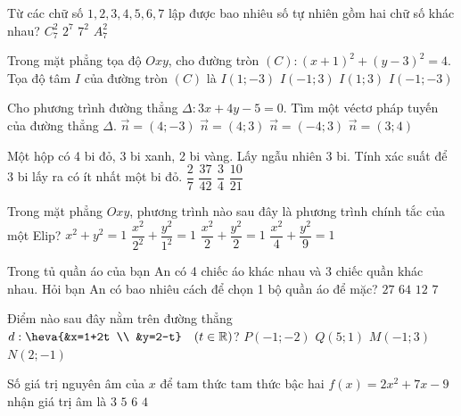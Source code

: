 \begin{ex}%
	Từ các chữ số $1,2,3,4,5,6,7$ lập được bao nhiêu số tự nhiên gồm hai chữ số khác nhau?
	\choice
	{$C_7^2$}
	{$2^7$}
	{$7^2$}
	{\True $A_7^2$}
	\loigiai{}
\end{ex}
\begin{ex}%
	Trong mặt phẳng tọa độ $Ox y$, cho đường tròn $(C)\colon (x+1)^2+(y-3)^2=4$. Tọa độ tâm $I$ của đường tròn $(C)$ là
	\choice
	{$I(1;-3)$}
	{\True $I(-1; 3)$}
	{$I(1; 3)$}
	{$I(-1;-3)$}
	\loigiai{}
\end{ex}
\begin{ex}%
	Cho phương trình đường thẳng $\Delta: 3x+4y-5=0$. Tìm một véctơ pháp tuyến của đường thẳng $\Delta$.
	\choice
	{$\vec{n}=(4;-3)$}
	{$\vec{n}=(4; 3)$}
	{$\vec{n}=(-4; 3)$}
	{\True $\vec{n}=(3; 4)$}
	\loigiai{}
\end{ex}
\begin{ex}%
	Một hộp có 4 bi đỏ, 3 bi xanh, 2 bi vàng. Lấy ngẫu nhiên 3 bi. Tính xác suất để 3 bi lấy ra có ít nhất một bi đỏ.
	\choice
	{$\dfrac{2}{7}$}
	{\True $\dfrac{37}{42}$}
	{$\dfrac{3}{4}$}
	{$\dfrac{10}{21}$}
	\loigiai{}
\end{ex}
\begin{ex}%
	Trong mặt phẳng $Ox y$, phương trình nào sau đây là phương trình chính tắc của một Elip?
	\choice
	{$x^2+y^2=1$}
	{\True $\dfrac{x^2}{2^2}+\dfrac{y^2}{1^2}=1$}
	{$\dfrac{x^2}{2}+\dfrac{y^2}{2}=1$}
	{$\dfrac{x^2}{4}+\dfrac{y^2}{9}=1$}
	\loigiai{}
\end{ex}
\begin{ex}%
	Trong tủ quần áo của bạn An có 4 chiếc áo khác nhau và 3 chiếc quần khác nhau. Hỏi bạn An có bao nhiêu cách để chọn 1 bộ quần áo để mặc?
	\choice
	{$27$}
	{$64$}
	{\True $12$}
	{$7$}
	\loigiai{}
\end{ex}
\begin{ex}%
	Điểm nào sau đây nằm trên đường thẳng $d:\heva{&x=1+2t \\
		&y=2-t} \quad(t \in \mathbb{R})$?
	\choice
	{$P(-1;-2)$}
	{$Q(5; 1)$}
	{\True $M(-1; 3)$}
	{$N(2;-1)$}
	\loigiai{}
\end{ex}
\begin{ex}%
	Số giá trị nguyên âm của $x$ để tam thức tam thức bậc hai $f(x)=2x^2+7x-9$ nhận giá trị âm là
	\choice
	{$3$}
	{$5$}
	{$6$}
	{\True $4$}
	\loigiai{}
\end{ex}

